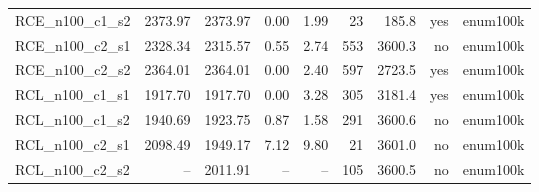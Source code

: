 \begin{tabular}{lrrrrrrrl}
RCE\_n100\_c1\_s2 & 2373.97 & 2373.97 & 0.00 & 1.99 & 23 & 185.8 & yes & enum100k \\
RCE\_n100\_c2\_s1 & 2328.34 & 2315.57 & 0.55 & 2.74 & 553 & 3600.3 & no & enum100k \\
RCE\_n100\_c2\_s2 & 2364.01 & 2364.01 & 0.00 & 2.40 & 597 & 2723.5 & yes & enum100k \\
RCL\_n100\_c1\_s1 & 1917.70 & 1917.70 & 0.00 & 3.28 & 305 & 3181.4 & yes & enum100k \\
RCL\_n100\_c1\_s2 & 1940.69 & 1923.75 & 0.87 & 1.58 & 291 & 3600.6 & no & enum100k \\
RCL\_n100\_c2\_s1 & 2098.49 & 1949.17 & 7.12 & 9.80 & 21 & 3601.0 & no & enum100k \\
RCL\_n100\_c2\_s2 & -- & 2011.91 & -- & -- & 105 & 3600.5 & no & enum100k \\
\bottomrule
\end{tabular}